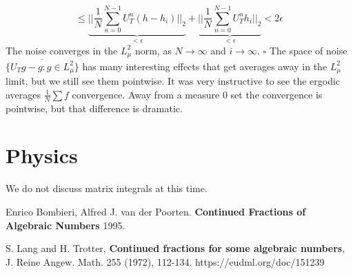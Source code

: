 \documentclass[12pt]{article}
\begin{document}
{{{$$\leq \underbrace{\big| \big| \frac{1}{N}\sum_{n=0}^{N-1} U_T^n  (h - h_i)\big|\big|_2}_{ < \epsilon}
+ \underbrace{\big| \big| \frac{1}{N}\sum_{n=0}^{N-1} U_T^n  h_i \big|\big|_2}_{< \epsilon}
 < 2 \epsilon$$
 The noise converges in the $L^2_\mu$ norm, as $N \to \infty$ and $i \to \infty$.
 \hfill $\square$
}
}
\newline \newline The space of noise $\overline{\{U_T g - g: g \in L^2_\mu \}}$ has many interesting effects that get averages away in the $L^2_\mu$ limit, but we still see them pointwise.  It was very instructive to see the ergodic averages $\frac{1}{N}\sum f$ convergence.  Away from a measure 0 set the convergence is pointwise, but that difference is dramatic.
 

\section{  \selectfont Physics}
We do not discuss matrix integrals at this time.

\begin{thebibliography}{9}

 Enrico Bombieri, Alfred J. van der Poorten.  \textbf{Continued Fractions of Algebraic Numbers} 1995.

 S. Lang and H. Trotter, \textbf{Continued fractions for some algebraic numbers}, J. Reine Angew. Math. 255 (1972), 112-134. https://eudml.org/doc/151239

\end{thebibliography}



}
\end{document}
